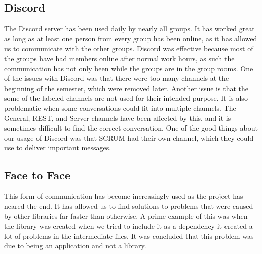 \subsection{Discord}
The Discord server has been used daily by nearly all groups. It has worked
great as long as at least one person from every group has been online, as it
has allowed us to communicate with the other groups. Discord was effective
because most of the groups have had members online after normal work hours, as
such the communication has not only been while the groups are in the group rooms.
One of the issues with Discord was that there were too many channels at the
beginning of the semester, which were removed later. Another issue is that the
some of the labeled channels are not used for their intended purpose. It is
also problematic when some conversations could fit into multiple channels. The
General, REST, and Server channels have been affected by this, and it is
sometimes difficult to find the correct conversation. One of the good things
about our usage of Discord was that SCRUM had their own channel, which they
could use to deliver important messages.

\subsection{Face to Face}
This form of communication has become increasingly used as the project has
neared the end. It has allowed us to find solutions to problems that were caused by
other libraries far faster than otherwise. A prime example of this was when the
 library was created when we tried to include it as
a dependency it created a lot of problems in the intermediate files. It was
concluded that this problem was due to  being an
application and not a library.
